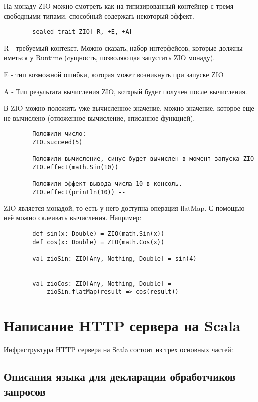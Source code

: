 \documentclass[14pt]{extarticle}
\begin{document}
    На монаду ZIO можно смотреть как на типизированный контейнер с тремя свободными типами, способный содержать некоторый эффект.

    \begin{verbatim}
        sealed trait ZIO[-R, +E, +A]
    \end{verbatim}

    R - требуемый контекст. Можно сказать, набор интерфейсов, которые должны иметься у Runtime (cущность, позволяющая
    запустить ZIO монаду).

    E - тип возможной ошибки, которая может возникнуть при запуске ZIO

    A - Тип результата вычисления ZIO, который будет получен после вычисления.

    В ZIO можно положить уже вычисленное значение, можно значение, которое еще не вычислено (отложенное вычисление,
    описанное функцией).

    \begin{verbatim}
        Положили число:
        ZIO.succeed(5)

        Положили вычисление, синус будет вычислен в момент запуска ZIO
        ZIO.effect(math.Sin(10))

        Положили эффект вывода числа 10 в консоль.
        ZIO.effect(println(10)) --
    \end{verbatim}

    ZIO является монадой, то есть у него доступна операция flatMap. С помощью неё можно склеивать вычисления. Например:

    \begin{verbatim}
        def sin(x: Double) = ZIO(math.Sin(x))
        def cos(x: Double) = ZIO(math.Cos(x))

        val zioSin: ZIO[Any, Nothing, Double] = sin(4)


        val zioCos: ZIO[Any, Nothing, Double] =
            zioSin.flatMap(result => cos(result))
    \end{verbatim}


    \section{Написание HTTP сервера на Scala}
    Инфраструктура HTTP сервера на Scala состоит из трех основных частей:

    \subsection{Описания языка для декларации обработчиков запросов}
\end{document}
